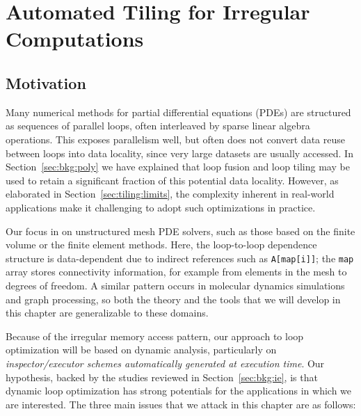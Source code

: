 \chapter{Automated Tiling for Irregular Computations}
\label{ch:sparsetiling}

\section{Motivation}





Many numerical methods for partial differential equations (PDEs) are structured as sequences of parallel loops, often interleaved by sparse linear algebra operations. This exposes parallelism well, but often does not convert data reuse between loops into data locality, since very large datasets are usually accessed. In Section~\ref{sec:bkg:poly} we have explained that loop fusion and loop tiling may be used to retain a significant fraction of this potential data locality. However, as elaborated in Section~\ref{sec:tiling:limits}, the complexity inherent in real-world applications make it challenging to adopt such optimizations in practice. 

Our focus in on unstructured mesh PDE solvers, such as those based on the finite volume or the finite element methods. Here, the  loop-to-loop dependence structure is data-dependent due to
indirect references such as \texttt{A[map[i]]}; the \texttt{map} array stores connectivity information, for example from elements in the mesh to degrees of freedom. A similar pattern occurs in molecular dynamics simulations and graph processing, so both the theory and the tools that we will develop in this chapter are generalizable to these domains. 

Because of the irregular memory access pattern, our approach to loop optimization will be based on dynamic analysis, particularly on \textit{inspector/executor schemes automatically generated at execution time}. Our hypothesis, backed by the studies reviewed in Section~\ref{sec:bkg:ie}, is that dynamic loop optimization has strong potentials for the applications in which we are interested. The three main issues that we attack in this chapter are as follows:

